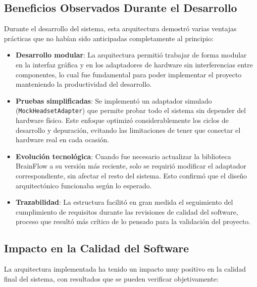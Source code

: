 \newpage
\subsection{Beneficios Observados Durante el Desarrollo}

Durante el desarrollo del sistema, esta arquitectura demostró varias ventajas prácticas que no habían sido anticipadas completamente al principio:

\begin{itemize}
    \item \textbf{Desarrollo modular}: La arquitectura permitió trabajar de forma modular en la interfaz gráfica y en los adaptadores de hardware sin interferencias entre componentes, lo cual fue fundamental para poder implementar el proyecto manteniendo la productividad del desarrollo.
    
    \item \textbf{Pruebas simplificadas}: Se implementó un adaptador simulado (\texttt{MockHeadsetAdapter}) que permite probar todo el sistema sin depender del hardware físico. Este enfoque optimizó considerablemente los ciclos de desarrollo y depuración, evitando las limitaciones de tener que conectar el hardware real en cada ocasión.
    
    \item \textbf{Evolución tecnológica}: Cuando fue necesario actualizar la biblioteca BrainFlow a su versión más reciente, solo se requirió modificar el adaptador correspondiente, sin afectar el resto del sistema. Esto confirmó que el diseño arquitectónico funcionaba según lo esperado.
    
    \item \textbf{Trazabilidad}: La estructura facilitó en gran medida el seguimiento del cumplimiento de requisitos durante las revisiones de calidad del software, proceso que resultó más crítico de lo pensado para la validación del proyecto.
\end{itemize}

\subsection{Impacto en la Calidad del Software}

La arquitectura implementada ha tenido un impacto muy positivo en la calidad final del sistema, con resultados que se pueden verificar objetivamente:

